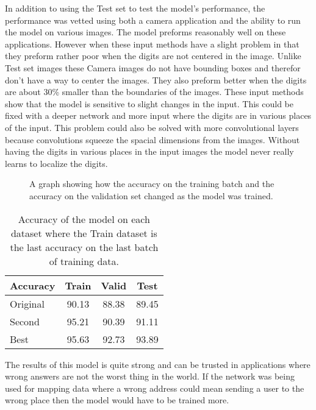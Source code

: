\documentclass[12pt,twocolumn,letterpaper]{article}
\begin{document}
In addition to using the Test set to test the model's performance, the performance was vetted using 
both a camera application and the ability to run the model on various images. The 
model preforms reasonably well on these applications. However when these input 
methods have a slight problem in that they preform rather poor when the digits 
are not centered in the image. Unlike Test set images these Camera images do not 
have bounding boxes and therefor don't have a way to center the images. 
They also preform better when the digits are about
30\% smaller than the boundaries of the images. These input methods show that the 
model is sensitive to slight changes in the input. This could be fixed with a 
deeper network and more input where the digits are in various places of the input.
This problem could also be solved with more convolutional layers because 
convolutions squeeze the spacial dimensions from the images. Without having the 
digits in various places in the input images the model never really learns to 
localize the digits.

\begin{figure}[t]
\begin{center}
\end{center}
   \caption{A graph showing how the accuracy on the training batch and the 
   accuracy on the validation set changed as the model was trained.}
\label{fig:accuracy}
\end{figure}

\begin{table}
\begin{center}
\begin{tabular}{|l|c|c|c|}
\hline
Accuracy & Train & Valid & Test \\
\hline
Original & 90.13 & 88.38 & 89.45 \\
\hline
Second & 95.21 & 90.39 & 91.11 \\
\hline
Best & 95.63 & 92.73 & 93.89 \\
\hline
\end{tabular}
\end{center}
\caption{Accuracy of the model on each dataset where the Train dataset is the
last accuracy on the last batch of training data.}
\label{table:acc}
\end{table}

The results of this model is quite strong and can be trusted in applications where
wrong answers are not the worst thing in the world. If the network was being used 
for mapping data where a wrong address could mean sending a user to the wrong place 
then the model would have to be trained more.
\end{document}

